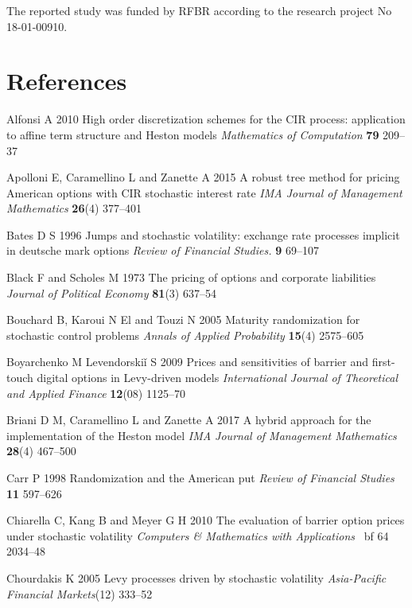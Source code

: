 \documentclass[a4paper]{jpconf}
\begin{document}
{\ack{}
The reported study was funded by RFBR according to the research project No 18-01-00910.

\section*{References}
\begin{thebibliography}{22}

 Alfonsi A 2010 High order discretization schemes for the CIR process: application to affine term structure and Heston models {\it Mathematics of Computation} {\bf 79} 209--37

 Apolloni E, Caramellino L and Zanette A 2015 A robust tree method for pricing American options with CIR stochastic interest rate {\it IMA Journal of Management Mathematics} {\bf 26}(4) 377--401

 Bates D S 1996 Jumps and stochastic volatility: exchange rate processes implicit in deutsche mark options {\it Review of Financial Studies.}  {\bf 9} 69--107

 Black F and Scholes M 1973 The pricing of options and corporate liabilities {\it Journal of Political Economy} {\bf 81}(3) 637--54

 Bouchard B, Karoui N El and Touzi N 2005 Maturity randomization for stochastic control problems  {\it Annals of Applied Probability} {\bf 15}(4) 2575--605

 Boyarchenko M Levendorski\v{i} S 2009 Prices and sensitivities of barrier and first-touch digital options in Levy-driven models {\it International Journal of Theoretical and Applied Finance} {\bf 12}(08) 1125--70

 Briani D M, Caramellino L and Zanette A 2017 A hybrid approach for the implementation of the Heston model {\it IMA Journal of Management Mathematics} {\bf 28}(4) 467--500

 Carr P 1998 Randomization and the American put {\it Review of Financial Studies} {\bf 11} 597--626

 Chiarella C, Kang B and Meyer G H 2010 The evaluation of barrier option prices under stochastic volatility {\it Computers \& Mathematics with Applications} {\ bf 64} 2034--48

 Chourdakis K 2005 Levy processes driven by stochastic volatility {\it Asia-Pacific Financial Markets}(12) 333--52


\end{thebibliography}}
\end{document}
